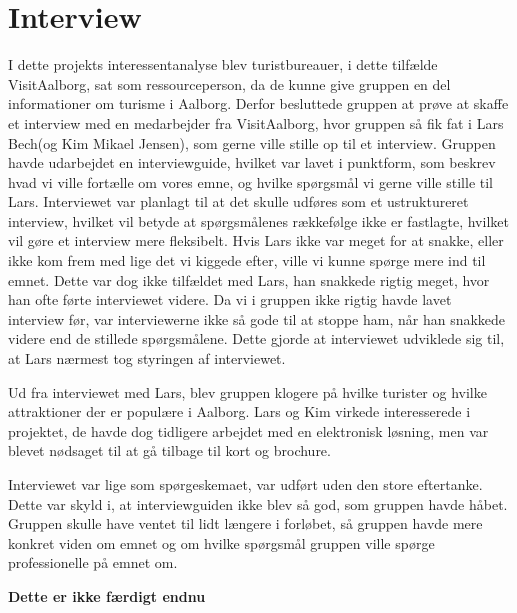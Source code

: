 \section{Interview}
I dette projekts interessentanalyse blev turistbureauer, i dette tilfælde VisitAalborg, sat som ressourceperson, da de kunne give gruppen en del informationer om turisme i Aalborg. Derfor besluttede gruppen at prøve at skaffe et interview med en medarbejder fra VisitAalborg, hvor gruppen så fik fat i Lars Bech(og Kim Mikael Jensen), som gerne ville stille op til et interview. Gruppen havde udarbejdet en interviewguide, hvilket var lavet i punktform, som beskrev hvad vi ville fortælle om vores emne, og hvilke spørgsmål vi gerne ville stille til Lars. Interviewet var planlagt til at det skulle udføres som et ustruktureret interview, hvilket vil betyde at spørgsmålenes rækkefølge ikke er fastlagte, hvilket vil gøre et interview mere fleksibelt. Hvis Lars ikke var meget for at snakke, eller ikke kom frem med lige det vi kiggede efter, ville vi kunne spørge mere ind til emnet. Dette var dog ikke tilfældet med Lars, han snakkede rigtig meget, hvor han ofte førte interviewet videre. Da vi i gruppen ikke rigtig havde lavet interview før, var interviewerne ikke så gode til at stoppe ham, når han snakkede videre end de stillede spørgsmålene. Dette gjorde at interviewet udviklede sig til, at Lars nærmest tog styringen af interviewet.

Ud fra interviewet med Lars, blev gruppen klogere på hvilke turister og hvilke attraktioner der er populære i Aalborg. Lars og Kim virkede interesserede i projektet, de havde dog tidligere arbejdet med en elektronisk løsning, men var blevet nødsaget til at gå tilbage til kort og brochure. 

Interviewet var lige som spørgeskemaet, var udført uden den store eftertanke. Dette var skyld i, at interviewguiden ikke blev så god, som gruppen havde håbet. Gruppen skulle have ventet til lidt længere i forløbet, så gruppen havde mere konkret viden om emnet og om hvilke spørgsmål gruppen ville spørge professionelle på emnet om. 

\textbf{Dette er ikke færdigt endnu}
